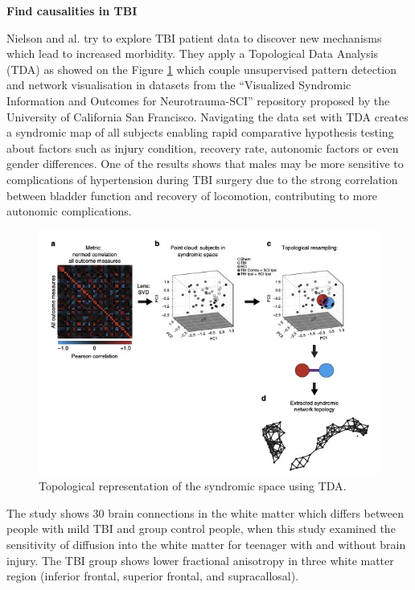 \documentclass[runningheads]{llncs}
\begin{document}
\bigskip
\noindent
\textbf{Find causalities in TBI} 

Nielson and al. \cite{nielson_topological_2015} try to explore TBI patient data to discover new mechanisms which lead to increased morbidity. They apply a Topological Data Analysis (TDA) as showed on the Figure \ref{fig:tda} which couple unsupervised pattern detection and network visualisation in datasets from the “Visualized Syndromic Information and Outcomes for Neurotrauma-SCI” repository proposed by the University of California San Francisco.  Navigating the data set with TDA creates a syndromic map of all subjects enabling rapid comparative hypothesis testing about factors such as injury condition, recovery rate, autonomic factors or even gender differences. One of the results shows that males may be more sensitive to complications of hypertension during TBI surgery due to the strong correlation between bladder function and recovery of locomotion, contributing to more autonomic complications.

\begin{figure}[]
\centering
\includegraphics[width=12cm]{imgs/fg1-jbvs.jpg}
\caption{Topological representation of the syndromic space using TDA\cite{nielson_topological_2015}.}
\label{fig:tda}
\end{figure}

The study \cite{mitra_statistical_2016} shows 30 brain connections in the white matter which differs between people with mild TBI and group control people, when this study \cite{wozniak_neurocognitive_2007} examined the sensitivity of diffusion into the white matter for teenager with and without brain injury. The TBI group shows lower fractional anisotropy in three white matter region (inferior frontal, superior frontal, and supracallosal).
\end{document}
